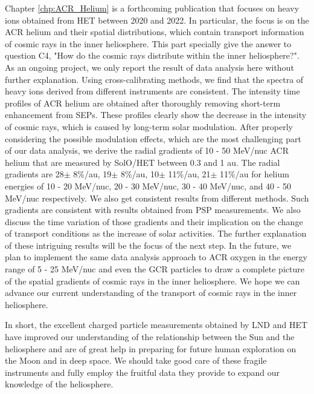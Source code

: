 Chapter \ref{chp:ACR_Helium} is a forthcoming publication that focuses on heavy ions obtained from \ac{HET} between 2020 and 2022. In particular, the focus is on the \ac{ACR} helium and their spatial distributions, which contain transport information of cosmic rays in the inner heliosphere. This part specially give the answer to question C4, "How do the cosmic rays distribute within the inner heliosphere?". As an ongoing project, we only report the result of data analysis here without further explanation. Using cross-calibrating methods, we find that the spectra of heavy ions derived from different instruments are consistent. The intensity time profiles of \ac{ACR} helium are obtained after thoroughly removing short-term enhancement from \acp{SEP}. These profiles clearly show the decrease in the intensity of cosmic rays, which is caused by long-term solar modulation.
After properly considering the possible modulation effects, which are the most challenging part of our data analysis, we derive the radial gradients of 10 - 50 MeV/nuc \ac{ACR} helium that are measured by \ac{SolO}/\ac{HET} between 0.3 and 1 au. The radial gradients are 28$\pm$ 8\%/au, 19$\pm$ 8\%/au, 10$\pm$ 11\%/au, 21$\pm$ 11\%/au for helium energies of 10 - 20 MeV/nuc, 20 - 30 MeV/nuc, 30 - 40 MeV/nuc, and 40 - 50 MeV/nuc respectively. We also get consistent results from different methods.
Such gradients are consistent with results obtained from \ac{PSP} measurements. We also discuss the time variation of those gradients and their implication on the change of transport conditions as the increase of solar activities. The further explanation of these intriguing results will be the focus of the next step. In the future,  we plan to implement the same data analysis approach to \ac{ACR} oxygen in the energy range of 5 - 25 MeV/nuc and even the \ac{GCR} particles to draw a complete picture of the spatial gradients of cosmic rays in the inner heliosphere. 
We hope we can advance our current understanding of the transport of cosmic rays in the inner heliosphere.


In short, the excellent charged particle measurements obtained by \ac{LND} and \ac{HET} have improved our understanding of the relationship between the Sun and the heliosphere and are of great help in preparing for future human exploration on the Moon and in deep space. We should take good care of these fragile instruments and fully employ the fruitful data they provide to expand our knowledge of the heliosphere.



